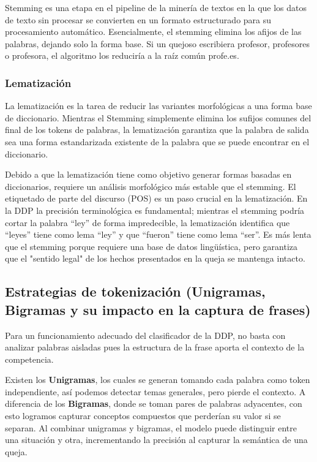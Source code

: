 Stemming es una etapa en el pipeline de la minería de textos en la que los datos de texto sin procesar se convierten en un formato estructurado para su procesamiento automático. Esencialmente, el stemming elimina los afijos de las palabras, dejando solo la forma base. Si un quejoso escribiera profesor, profesores o profesora, el algoritmo los reduciría a la raíz común profe.es.

\subsubsection{Lematización}

La lematización es la tarea de reducir las variantes morfológicas a una forma base de diccionario. Mientras el Stemming simplemente elimina los sufijos comunes del final de los tokens de palabras, la lematización garantiza que la palabra de salida sea una forma estandarizada existente de la palabra que se puede encontrar en el diccionario.

Debido a que la lematización tiene como objetivo generar formas basadas en diccionarios, requiere un análisis morfológico más estable que el stemming. El etiquetado de parte del discurso (POS) es un paso crucial en la lematización. En la DDP la precisión terminológica es fundamental; mientras el stemming podría cortar la palabra “ley” de forma impredecible, la lematización identifica que “leyes” tiene como lema “ley” y que “fueron” tiene como lema “ser”. Es más lenta que el stemming porque requiere una base de datos lingüística, pero garantiza que el "sentido legal" de los hechos presentados en la queja se mantenga intacto.

\subsection{Estrategias de tokenización (Unigramas, Bigramas y su impacto en la captura de frases)}

Para un funcionamiento adecuado del clasificador de la DDP, no basta con analizar palabras aisladas pues la estructura de la frase aporta el contexto de la competencia.

Existen los \textbf{Unigramas}, los cuales se generan tomando cada palabra como token independiente, así podemos detectar temas generales, pero pierde el contexto. A diferencia de los \textbf{Bigramas}, donde se toman pares de palabras adyacentes, con esto logramos capturar conceptos compuestos que perderían su valor si se separan. Al combinar unigramas y bigramas, el modelo puede distinguir entre una situación y otra, incrementando la precisión al capturar la semántica de una queja.

